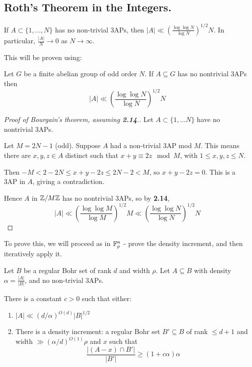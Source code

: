 \documentclass[10pt,a4paper]{article}
\begin{document}
\subsection{Roth's Theorem in the Integers.}
\begin{theorem}[Bourgain, 1999]
  If $A \subset \{1, \ldots, N\}$ has no non-trivial 3APs, then $|A| \ll \left(\frac{\log\log N}{\log N}\right)^{1/2}N$. In particular, $\frac{|A|}{N} \to 0$ as $N \to \infty$.
\end{theorem}
This will be proven using:
\begin{theorem}
  Let $G$ be a finite abelian group of odd order $N$. If $A \subseteq G$ has no nontrivial 3APs then
  \[|A| \ll \left(\frac{\log\log N}{\log N}\right)^{1/2} N\]
\end{theorem}
\begin{proof}[Proof of Bourgain's theorem, assuming \textbf{2.14}.]
  Let $A \subset \{1, \ldots N\}$ have no nontrivial 3APs.

  Let $M = 2N-1$ (odd). Suppose $A$ had a non-trivial 3AP mod $M$. This means there are $x,y,z \in A$ distinct such that $x+y \equiv 2z \mod M$, with $1 \leq x,y,z \leq N$.

  Then $-M < 2-2N \leq x+y-2z \leq 2N-2 < M$, so $x+y-2z =0$. This is a 3AP in $A$, giving a contradiction.

  Hence $A$ in $\mathbb{Z}/M\mathbb{Z}$ has no nontrivial 3APs, so by \textbf{2.14},
  \[|A| \ll \left(\frac{\log\log M}{\log M}\right)^{1/2}M \ll \left(\frac{\log\log N}{\log N}\right)^{1/2}N\]
\end{proof}
To prove this, we will proceed as in $\mathbb{F}_p^n$ - prove the density increment, and then iteratively apply it.
\begin{lemma}
  Let $B$ be a regular Bohr set of rank $d$ and width $\rho$. Let $A \subseteq B$ with density $\alpha = \frac{|A|}{|B|}$, and no non-trivial 3APs.

  There is a constant $c > 0$ such that either:
  \begin{enumerate}
    \item $|A| \ll (d/\alpha)^{O(d)}|B|^{1/2}$
    \item There is a density increment: a regular Bohr set $B' \subseteq B$ of rank $\leq d+1$ and width $\gg (\alpha/d)^{O(1)}\rho$ and $x$ such that
    \[\frac{|(A-x)\cap B'|}{|B'|} \geq (1+c\alpha)\alpha\]
  \end{enumerate}
\end{lemma}
\end{document}
